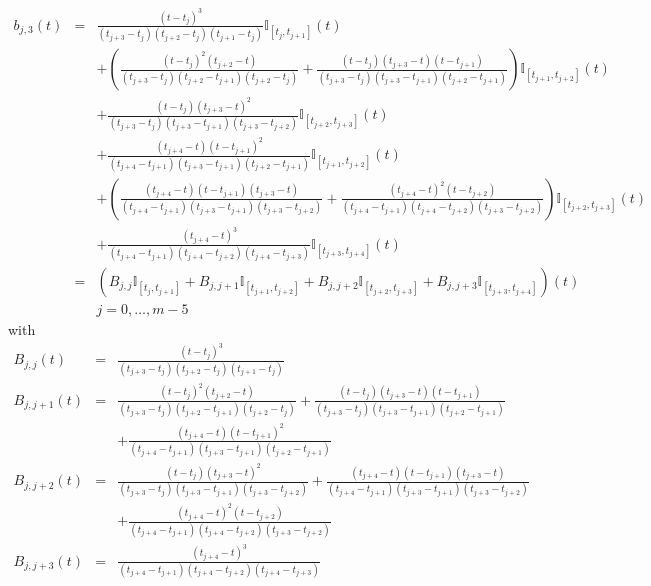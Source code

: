\documentclass {article}
\begin{document}
\begin{eqnarray*}
b_{j,3}(t) &=& \frac{(t - t_j)^3}{(t_{j+3} - t_j)(t_{j+2} - t_j)(t_{j+1} - t_j)}\mathbb{I}_{[t_j, t_{j+1}]}(t) \\
&&+(\frac{(t - t_j)^2(t_{j+2} - t)}{(t_{j+3} - t_j)(t_{j+2} - t_{j+1})(t_{j+2} - t_j)}+
\frac{(t - t_j)(t_{j+3} - t)(t - t_{j+1})}{(t_{j+3} - t_j)(t_{j+3} - t_{j+1})(t_{j+2} - t_{j+1})})
\mathbb{I}_{[t_{j+1}, t_{j+2}]}(t) \\
&&+\frac{(t - t_j)(t_{j+3} - t)^2}{(t_{j+3} - t_j)(t_{j+3} - t_{j+1})(t_{j+3} - t_{j+2})} \mathbb{I}_{[t_{j+2}, t_{j+3}]}(t)\\
&&+\frac{(t_{j+4} - t)(t - t_{j+1})^2}{(t_{j+4} - t_{j+1})(t_{j+3} - t_{j+1})(t_{j+2} - t_{j+1})}\mathbb{I}_{[t_{j+1}, t_{j+2}]}(t) \\
&&+(\frac{(t_{j+4} - t)(t - t_{j+1})(t_{j+3} - t)}{(t_{j+4} - t_{j+1})(t_{j+3} - t_{j+1})(t_{j+3} - t_{j+2})}+
\frac{(t_{j+4} - t)^2(t - t_{j+2})}{(t_{j+4} - t_{j+1})(t_{j+4} - t_{j+2})(t_{j+3} - t_{j+2})})
\mathbb{I}_{[t_{j+2}, t_{j+3}]}(t) \\
&&+\frac{(t_{j+4} - t)^3}{(t_{j+4} - t_{j+1})(t_{j+4} - t_{j+2})(t_{j+4} - t_{j+3})} \mathbb{I}_{[t_{j+3}, t_{j+4}]}(t)\\
&=& (B_{j, j} \mathbb{I}_{[t_j, t_{j+1}]} + B_{j,j+1} \mathbb{I}_{[t_{j+1}, t_{j+2}]} +B_{j,j+2} \mathbb{I}_{[t_{j+2}, t_{j+3}]}+B_{j,j+3} \mathbb{I}_{[t_{j+3}, t_{j+4}]})(t)\\
&&j=0,\ldots, m-5
\end{eqnarray*}
with
\begin{eqnarray*}
B_{j, j} (t) &=& \frac{(t - t_j)^3}{(t_{j+3} - t_j)(t_{j+2} - t_j)(t_{j+1} - t_j)} \\
B_{j,j+1} (t) &=& \frac{(t - t_j)^2(t_{j+2} - t)}{(t_{j+3} - t_j)(t_{j+2} - t_{j+1})(t_{j+2} - t_j)}+\frac{(t - t_j)(t_{j+3} - t)(t - t_{j+1})}{(t_{j+3} - t_j)(t_{j+3} - t_{j+1})(t_{j+2} - t_{j+1})}\\
&&+\frac{(t_{j+4} - t)(t - t_{j+1})^2}{(t_{j+4} - t_{j+1})(t_{j+3} - t_{j+1})(t_{j+2} - t_{j+1})} \\
B_{j,j+2} (t) &=& \frac{(t - t_j)(t_{j+3} - t)^2}{(t_{j+3} - t_j)(t_{j+3} - t_{j+1})(t_{j+3} - t_{j+2})}+\frac{(t_{j+4} - t)(t - t_{j+1})(t_{j+3} - t)}{(t_{j+4} - t_{j+1})(t_{j+3} - t_{j+1})(t_{j+3} - t_{j+2})}\\
&&+\frac{(t_{j+4} - t)^2(t - t_{j+2})}{(t_{j+4} - t_{j+1})(t_{j+4} - t_{j+2})(t_{j+3} - t_{j+2})}\\
B_{j,j+3} (t) &=& \frac{(t_{j+4} - t)^3}{(t_{j+4} - t_{j+1})(t_{j+4} - t_{j+2})(t_{j+4} - t_{j+3})}
\end{eqnarray*}
\end{document}
